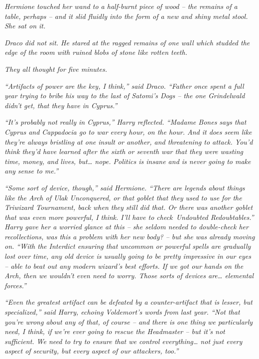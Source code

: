 \emph{Hermione touched her wand to a half-burnt piece of wood -- the
remains of a table, perhaps -- and it slid fluidly into the form of a
new and shiny metal stool. She sat on it.}

\emph{Draco did not sit. He stared at the ragged remains of one wall
which studded the edge of the room with ruined blobs of stone like
rotten teeth.}

\emph{They all thought for five minutes.}

\emph{``Artifacts of power are the key, I think,'' said Draco. ``Father
once spent a full year trying to bribe his way to the last of Satomi's
Dogs -- the one Grindelwald didn't get, that they have in Cyprus.''}

\emph{``It's probably not really in Cyprus,'' Harry reflected. ``Madame
Bones says that Cyprus and Cappadocia go to war every hour, on the hour.
And it does seem like they're always bristling at one insult or another,
and threatening to attack. You'd think they'd have learned after the
sixth or seventh war that they were wasting time, money, and lives,
but\ldots{} nope. Politics is insane and is never going to make any
sense to me.''}

\emph{``Some sort of device, though,'' said Hermione. ``There are
legends about things like the Arch of Ulak Unconquered, or that goblet
that they used to use for the Triwizard Tournament, back when they still
did that. Or there was another goblet that was even more powerful, I
think. I'll have to check\emph{~Undoubted Redoubtables.}'' Harry gave
her a worried glance at this -- she seldom needed to double-check her
recollections, was this a problem with her new body? -- but she was
already moving on. ``With the Interdict ensuring that uncommon or
powerful spells are gradually lost over time, any old device is usually
going to be pretty impressive in our eyes -- able to beat out any modern
wizard's best efforts. If we got our hands on the Arch, then we wouldn't
even need to worry. Those sorts of devices are\ldots{} elemental
forces.''}

\emph{``Even the greatest artifact can be defeated by a counter-artifact
that is lesser, but specialized,'' said Harry, echoing Voldemort's words
from last year. ``Not that you're wrong about any of that, of course --
and there is one thing we particularly need, I think, if we're ever
going to rescue the Headmaster -- but it's not sufficient. We need to
try to ensure that we control everything\ldots{} not just every aspect
of security, but every aspect of our attackers, too.''}

